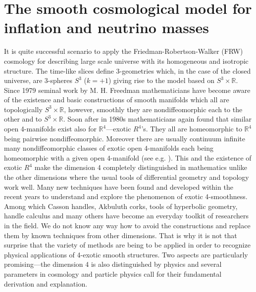 \documentclass[12pt]{article}
\begin{document}
\section{The smooth cosmological model for inflation and neutrino masses}\label{sec:2}
It is quite successful scenario to apply the Friedman-Robertson-Walker (FRW) cosmology for describing large scale universe with its homogeneous and isotropic structure. The time-like slices define 3-geometries which, in the case of the closed universe, are 3-spheres $S^3$ ($k=+1$) giving rise to the model based on $S^3\times \mathbb{R}$. Since 1979 seminal work by M. H. Freedman \cite{Freedman1979} mathematicians have become aware of the existence and basic constructions of smooth manifolds which all are topologically $S^3\times \mathbb{R}$, however, smoothly they are nondiffeomorphic each to the other and to $S^3\times \mathbb{R}$. Soon after in 1980s mathematicians again found that similar open 4-manifolds exist also for $\mathbb{R}^4$---exotic $R^4$'s. They all are homeomorphic to $\mathbb{R}^4$ being pairwise nondiffeomorphic. Moreover there are usually continuum infinite many nondiffeomorphic classes of exotic open 4-manifolds each being homeomorphic with a given open 4-manifold (see e.g. \cite{GS1999}). This and the existence of exotic $R^4$ make the dimension 4 completely distinguished in mathematics unlike the other dimensions where the usual tools of differential geometry and topology work well. Many new techniques have been found and developed within the recent years to understand and explore the phenomenon of exotic 4-smoothness. Among which Casson handles, Akbuluth corks, tools of hyperbolic geometry, handle calculus and many others have become an everyday toolkit of researchers in the field. We do not know any way how to avoid the constructions and replace them by known techniques from other dimensions. That is why it is not that surprise that the variety of methods are being to be applied in order to recognize physical applications of 4-exotic smooth structures. Two aspects are particularly promising---the dimension 4 is also distinguished by physics and several parameters in cosmology and particle physics call for their fundamental derivation and explanation. 
\end{document}
